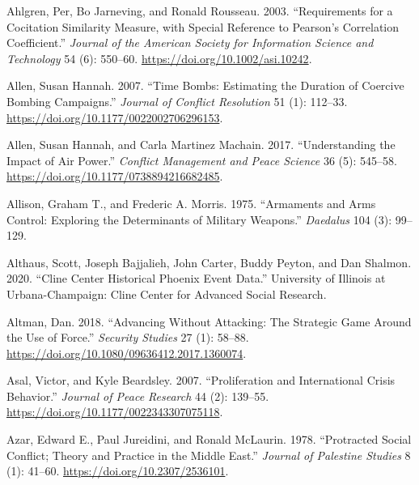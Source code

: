 \documentclass[
]{article}
\begin{document}
\hypertarget{refs}{}
\leavevmode\hypertarget{ref-ahlgren_requirementscocitationsimilarity_2003}{}%
Ahlgren, Per, Bo Jarneving, and Ronald Rousseau. 2003. ``Requirements for a Cocitation Similarity Measure, with Special Reference to Pearson's Correlation Coefficient.'' \emph{Journal of the American Society for Information Science and Technology} 54 (6): 550--60. \url{https://doi.org/10.1002/asi.10242}.

\leavevmode\hypertarget{ref-allen_timebombsestimating_2007}{}%
Allen, Susan Hannah. 2007. ``Time Bombs: Estimating the Duration of Coercive Bombing Campaigns.'' \emph{Journal of Conflict Resolution} 51 (1): 112--33. \url{https://doi.org/10.1177/0022002706296153}.

\leavevmode\hypertarget{ref-allen_understandingimpactair_2017}{}%
Allen, Susan Hannah, and Carla Martinez Machain. 2017. ``Understanding the Impact of Air Power.'' \emph{Conflict Management and Peace Science} 36 (5): 545--58. \url{https://doi.org/10.1177/0738894216682485}.

\leavevmode\hypertarget{ref-allison_armamentsarmscontrol_1975}{}%
Allison, Graham T., and Frederic A. Morris. 1975. ``Armaments and Arms Control: Exploring the Determinants of Military Weapons.'' \emph{Daedalus} 104 (3): 99--129.

\leavevmode\hypertarget{ref-althaus_clinecenterhistorical_2020}{}%
Althaus, Scott, Joseph Bajjalieh, John Carter, Buddy Peyton, and Dan Shalmon. 2020. ``Cline Center Historical Phoenix Event Data.'' University of Illinois at Urbana-Champaign: Cline Center for Advanced Social Research.

\leavevmode\hypertarget{ref-altman_advancingattackingstrategic_2018}{}%
Altman, Dan. 2018. ``Advancing Without Attacking: The Strategic Game Around the Use of Force.'' \emph{Security Studies} 27 (1): 58--88. \url{https://doi.org/10.1080/09636412.2017.1360074}.

\leavevmode\hypertarget{ref-asal_proliferationinternationalcrisis_2007}{}%
Asal, Victor, and Kyle Beardsley. 2007. ``Proliferation and International Crisis Behavior.'' \emph{Journal of Peace Research} 44 (2): 139--55. \url{https://doi.org/10.1177/0022343307075118}.

\leavevmode\hypertarget{ref-azar_protractedsocialconflict_1978}{}%
Azar, Edward E., Paul Jureidini, and Ronald McLaurin. 1978. ``Protracted Social Conflict; Theory and Practice in the Middle East.'' \emph{Journal of Palestine Studies} 8 (1): 41--60. \url{https://doi.org/10.2307/2536101}.
\end{document}
